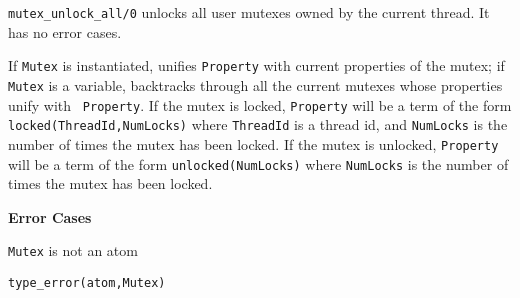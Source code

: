 \begin{description}
%
{\tt mutex\_unlock\_all/0} unlocks all user mutexes owned by the
current thread.  It has no error cases.

%
If {\tt Mutex} is instantiated, unifies {\tt Property} with current
properties of the mutex; if {\tt Mutex} is a variable, backtracks
through all the current mutexes whose properties unify with {\tt
  Property}.  If the mutex is locked, {\tt Property} will be a term of
the form {\tt locked(ThreadId,NumLocks)} where {\tt ThreadId} is a
thread id, and {\tt NumLocks} is the number of times the mutex has
been locked.  If the mutex is unlocked, {\tt Property} will be a term
of the form {\tt unlocked(NumLocks)} where {\tt NumLocks} is the
number of times the mutex has been locked.

{\bf Error Cases}
\bi
\item 	{\tt Mutex} is not an atom
\bi
\item 	{\tt type\_error(atom,Mutex)}
\ei
\ei

\end{description}


